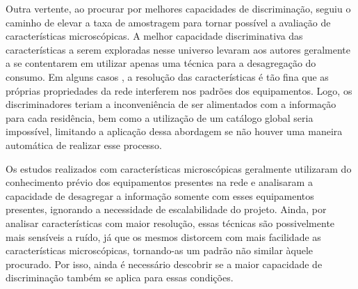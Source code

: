 Outra vertente, ao procurar por melhores capacidades de discriminação,
seguiu o caminho de elevar a taxa de amostragem \cite{
nilm_zeifman_vast_hisample_pdfmerge_2011,nilm_liang_pt1_2010_34,
nilm_liang_pt2_2010_40,nilm_patel_2007_29,nilm_gupta_patel_2010_30,
nilm_lee_variable_speed_estimation_2005_24,
nilm_wichakool_2009_25,nilm_shaw_2008_26,nilm_berges_2008_7,nilm_berges_2009_36,
2010_nilm_melhorando_pph_usa_37,nilm_chan_2000_31,nilm_coppe_nascimento,
nilm_lee_2004_32,nilm_lam_2007_33, nilm_srinivasan_nn_2006_27,
nilm_itajuba_rodrigues,nilm_suzuki_2011_35} para tornar possível a
avaliação de características microscópicas. A melhor capacidade
discriminativa das características a serem exploradas nesse universo
levaram aos autores geralmente a se contentarem em utilizar apenas uma
técnica para a desagregação do consumo. Em alguns casos \cite{
nilm_patel_2007_29,nilm_gupta_patel_2010_30}, a
resolução das características é tão fina que as próprias propriedades
da rede interferem nos padrões dos equipamentos. Logo, os discriminadores
teriam a inconveniência de ser alimentados com a informação para
cada residência, bem como a utilização de um catálogo global seria
impossível, limitando a aplicação dessa abordagem se não houver
uma maneira automática de realizar esse processo.

Os estudos realizados com características microscópicas geralmente
utilizaram do conhecimento prévio dos equipamentos presentes na rede e
analisaram a capacidade de desagregar a informação somente com esses
equipamentos presentes, ignorando a necessidade de escalabilidade do
projeto. Ainda, por analisar características com maior resolução,
essas técnicas são possivelmente mais sensíveis a ruído, já que os
mesmos distorcem com mais facilidade as características microscópicas,
tornando-as um padrão não similar àquele procurado. Por isso,
ainda é necessário descobrir se a maior capacidade de discriminação
também se aplica para essas condições.

